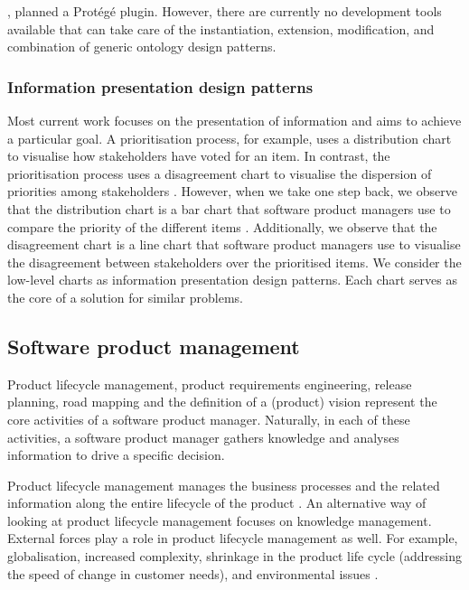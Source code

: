 \cite{ODP03}, planned a Prot\'eg\'e plugin. However, there are currently no development tools available that can take care of the instantiation, extension, modification, and combination of generic ontology design patterns. 

\subsubsection{Information presentation design patterns}
Most current work focuses on the presentation of information and aims to achieve a particular goal. A prioritisation process, for example, uses a distribution chart to visualise how stakeholders have voted for an item. In contrast, the prioritisation process uses a disagreement chart to visualise the dispersion of priorities among stakeholders \parencite{BI08}. However, when we take one step back, we observe that the distribution chart is a bar chart that software product managers use to compare the priority of the different items \parencite{OTH09}. Additionally, we observe that the disagreement chart is a line chart that software product managers use to visualise the disagreement between stakeholders over the prioritised items. We consider the low-level charts as information presentation design patterns. Each chart serves as the core of a solution for similar problems. 

\subsection{Software product management} \label{tf-spm}
Product lifecycle management, product requirements engineering, release planning, road mapping and the definition of a (product) vision \parencite{PM02} represent the core activities of a software product manager. Naturally, in each of these activities, a software product manager gathers knowledge and analyses information to drive a specific decision.

Product lifecycle management manages the business processes and the related information along the entire lifecycle of the product \parencite{PM14}. An alternative way of looking at product lifecycle management focuses on knowledge management. External forces play a role in product lifecycle management as well. For example, globalisation, increased complexity, shrinkage in the product life cycle (addressing the speed of change in customer needs), and environmental issues \parencite{PM15}.

